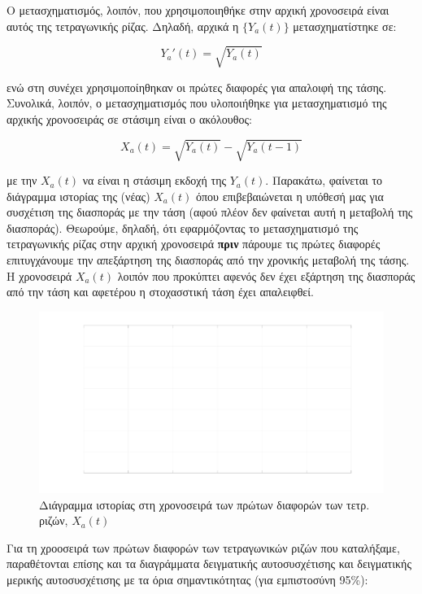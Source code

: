 Ο μετασχηματισμός, λοιπόν, που χρησιμοποιηθήκε στην αρχική χρονοσειρά είναι αυτός της τετραγωνικής ρίζας. Δηλαδή, αρχικά η $\{Y_a(t)\}$ μετασχηματίστηκε σε:

\[ Y_a'(t) = \sqrt{Y_a(t)} \]

ενώ στη συνέχει χρησιμοποίηθηκαν οι πρώτες διαφορές για απαλοιφή της τάσης. Συνολικά, λοιπόν, ο μετασχηματισμός που υλοποιήθηκε για μετασχηματισμό της αρχικής χρονοσειράς σε στάσιμη είναι ο ακόλουθος:

\[ X_a(t) = \sqrt{Y_a(t)} - \sqrt{Y_a(t-1)} \]

με την $X_a(t)$ να είναι η στάσιμη εκδοχή της $Y_a(t)$. Παρακάτω, φαίνεται το διάγραμμα ιστορίας της (νέας) $X_a(t)$ όπου επιβεβαιώνεται η υπόθεσή μας για συσχέτιση της διασποράς με την τάση (αφού πλέον δεν φαίνεται αυτή η  μεταβολή της διασποράς). Θεωρούμε, δηλαδή, ότι εφαρμόζοντας το μετασχηματισμό της τετραγωνικής ρίζας στην αρχική χρονοσειρά \textbf{πριν} πάρουμε τις πρώτες διαφορές επιτυγχάνουμε την απεξάρτηση της διασποράς από την χρονικής μεταβολή της τάσης. Η χρονοσειρά ${X_a(t)}$ λοιπόν που προκύπτει αφενός δεν έχει εξάρτηση της διασποράς από την τάση και αφετέρου η στοχασστική τάση έχει απαλειφθεί.

\begin{figure}[H]
    \begin{center}
        \includegraphics[width=\textwidth]{plots/xa_sqrt_of_1st_differences_history.svg.pdf}
        \caption{Διάγραμμα ιστορίας στη χρονοσειρά των πρώτων διαφορών των τετρ. ριζών, \emph{${X_a(t)}$}}
        \label{fig:xa_sqrt_of_1st_differences_history}
    \end{center}
\end{figure}

Για τη χροοσειρά των πρώτων διαφορών των τετραγωνικών ριζών που καταλήξαμε, παραθέτονται επίσης και τα διαγράμματα δειγματικής αυτοσυσχέτισης και δειγματικής μερικής αυτοσυσχέτισης με τα όρια σημαντικότητας (για εμπιστοσύνη 95\%):

